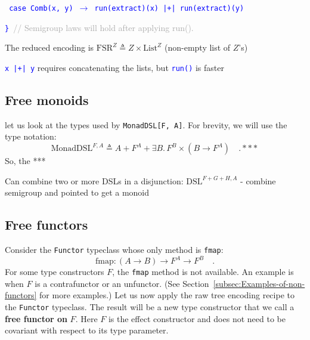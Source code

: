 \texttt{\textcolor{blue}{\footnotesize{}  case Comb(x, y) $\rightarrow$
run(extract)(x) |+| run(extract)(y)}}{\footnotesize\par}

\texttt{\textcolor{blue}{\footnotesize{}\} }}\textcolor{darkgray}{\footnotesize{}//
Semigroup laws will hold after applying run().}{\footnotesize\par}

The reduced encoding is $\text{FSR}^{Z}\triangleq Z\times\text{List}^{Z}$
(non-empty list of $Z$\textsf{'}s)

\texttt{\textcolor{blue}{\footnotesize{}x |+| y}} requires concatenating
the lists, but \texttt{\textcolor{blue}{\footnotesize{}run()}} is
faster

\subsection{Free monoids}

let us look at the types used by \lstinline!MonadDSL[F, A]!.
For brevity, we will use the type notation:
\[
\text{MonadDSL}^{F,A}\triangleq A+F^{A}+\exists B.\,F^{B}\times(B\rightarrow F^{A})\quad.***
\]
 So, the {*}{*}{*}

Can combine two or more DSLs in a disjunction: $\text{DSL}^{F+G+H,A}$
- combine semigroup and pointed to get a monoid

\subsection{Free functors}

Consider the \lstinline!Functor!
typeclass whose only method is \lstinline!fmap!:
\[
\text{fmap}:\left(A\rightarrow B\right)\rightarrow F^{A}\rightarrow F^{B}\quad.
\]
For some type constructors $F$, the \lstinline!fmap!
method is not available. An example is when $F$ is a contrafunctor
or an unfunctor. (See Section~\ref{subsec:Examples-of-non-functors}
for more examples.) Let us now apply the raw tree encoding recipe
to the \lstinline!Functor!
typeclass. The result will be a new type constructor that we call
a \textbf{free functor on} $F$. Here $F$ is
the effect constructor and does not need to be covariant with respect
to its type parameter.

